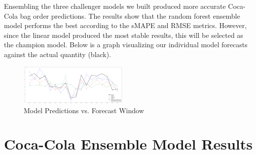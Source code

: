 \documentclass[12pt,oneside]{chicagocapstone}
\begin{document}
Ensembling the three challenger models we built produced more accurate Coca-Cola bag order predictions. The results show that the random forest ensemble model performs the best according to the sMAPE and RMSE metrics. However, since the linear model produced the most stable results, this will be selected as the champion model. Below is a graph visualizing our individual model forecasts against the actual quantity (black).
\begin{figure}

{\centering \includegraphics[width=200px,angle = 0, scale=2.5]{figure/timeplot} 

}

\caption{Model Predictions vs. Forecast Window}\label{fig:timeplot}
\end{figure}
\hypertarget{coca-cola-ensemble-model-results}{%
\section*{Coca-Cola Ensemble Model Results}\label{coca-cola-ensemble-model-results}}
\end{document}
